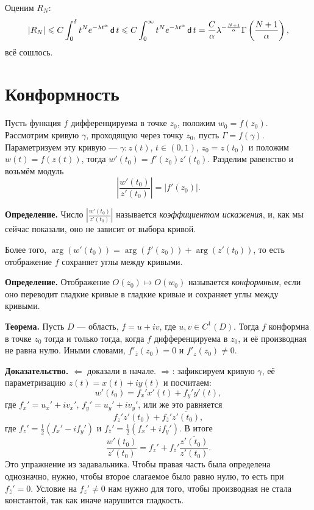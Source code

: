 Оценим $R_N$:
\[
    |R_N| \leqslant C \int_0^\delta t^N e^{-\lambda t^\alpha} \operatorname{\mathsf d} t \leqslant C \int_0^\infty t^N e^{-\lambda t^\alpha} \operatorname{\mathsf d} t = \frac{C}{\alpha} \lambda^{-\frac{N+1}{\alpha}} \Gamma \left( \frac{N+1}{\alpha} \right),
\]
всё сошлось.

\QED

\section{Конформность}
Пусть функция $f$ дифференцируема в точке $z_0$, положим $w_0 = f(z_0)$.
Рассмотрим кривую $\gamma$, проходящую через точку $z_0$, пусть $\Gamma = f(\gamma)$.
Параметризуем эту кривую --- $\gamma: z(t)$, $t \in (0, 1)$, $z_0 = z(t_0)$ и положим $w(t) = f(z(t))$, тогда $w'(t_0) = f'(z_0) z'(t_0)$.
Разделим равенство и возьмём модуль
\[
    \left| \frac{w'(t_0)}{z'(t_0)} \right| = |f'(z_0)|.
\]

\textbf{Определение.} Число $|\frac{w'(t_0)}{z'(t_0)}|$ называется \textit{коэффициентом искажения}, и, как мы сейчас показали, оно не зависит от выбора кривой.

Более того, $\arg(w'(t_0)) = \arg(f'(z_0)) + \arg(z'(t_0))$, то есть отображение $f$ сохраняет углы между кривыми.

\textbf{Определение.} Отображение $O(z_0) \mapsto O(w_0)$ называется \textit{конформным}, если оно переводит гладкие кривые в гладкие кривые и сохраняет углы между кривыми.

\textbf{Теорема.} Пусть $D$ --- область, $f = u + iv$, где $u, v \in C^1(D)$.
Тогда $f$ конформна в точке $z_0$ тогда и только тогда, когда $f$ дифференцируема в $z_0$, и её производная не равна нулю.
Иными словами, $f'_{\overline z}(z_0) = 0$ и $f'_z(z_0) \ne 0$.

\textbf{Доказательство.} $\Leftarrow$ доказали в начале. $\Rightarrow$: зафиксируем кривую $\gamma$, её параметризацию $z(t) = x(t) + i y(t)$ и посчитаем:
\[
    w'(t_0) = f_x' x'(t) + f_y' y'(t),
\]
где $f_x' = u_x' + iv_x'$, $f_y' = u_y' + iv_y'$, или же это равняется
\[
    f_z' z'(t_0) + f_{\overline z}' \overline{z'(t_0)},
\]
где $f_z' = \frac{1}{2} (f_x' - i f_y')$ и $f_{\overline z}' = \frac{1}{2} (f_x' + if_y')$.
В итоге
\[
    \frac{w'(t_0)}{z'(t_0)} = f_z' + f_{\overline z}' \frac{\overline {z'(t_0)}}{z'(t_0)}.
\]
Это упражнение из задавальника. Чтобы правая часть была определена однозначно, нужно, чтобы второе слагаемое было равно нулю, то есть при $f_{\overline z}' = 0$.
Условие на $f_z' \ne 0$ нам нужно для того, чтобы производная не стала константой, так как иначе нарушится гладкость.

